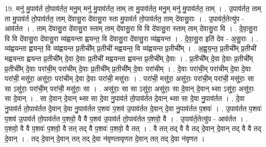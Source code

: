 \documentclass[17pt]{extarticle}
\begin{document}
19. मनु॑ मु॒पाव॑र्त तो॒पाव॑र्तत॒ मनु॒म् मनु॑ मु॒पाव॑र्तत॒ ताम् ता मु॒पाव॑र्तत॒ मनु॒म् मनु॑ मु॒पाव॑र्तत॒ ताम् । . उ॒पाव॑र्तत॒ ताम् ता मु॒पाव॑र्त तो॒पाव॑र्तत॒ ताम् दे॑वासु॒रा दे॑वासु॒रा स्ता मु॒पाव॑र्त तो॒पाव॑र्तत॒ ताम् दे॑वासु॒राः । . उ॒पाव॑र्त॒तेत्यु॑प - आव॑र्तत । . ताम् दे॑वासु॒रा दे॑वासु॒रा स्ताम् ताम् दे॑वासु॒रा वि वि दे॑वासु॒रा स्ताम् ताम् दे॑वासु॒रा वि । . दे॒वा॒सु॒रा वि वि दे॑वासु॒रा दे॑वासु॒रा व्य॑ह्वयन्ता ह्वयन्त॒ वि दे॑वासु॒रा दे॑वासु॒रा व्य॑ह्वयन्त । . दे॒वा॒सु॒रा इति॑ देव - अ॒सु॒राः । . व्य॑ह्वयन्ता ह्वयन्त॒ वि व्य॑ह्वयन्त प्र॒तीची᳚म् प्र॒तीची॑ मह्वयन्त॒ वि व्य॑ह्वयन्त प्र॒तीची᳚म् । . अ॒ह्व॒य॒न्त॒ प्र॒तीची᳚म् प्र॒तीची॑ मह्वयन्ता ह्वयन्त प्र॒तीची᳚म् दे॒वा दे॒वाः प्र॒तीची॑ मह्वयन्ता ह्वयन्त प्र॒तीची᳚म् दे॒वाः । . प्र॒तीची᳚म् दे॒वा दे॒वाः प्र॒तीची᳚म् प्र॒तीची᳚म् दे॒वाः परा॑ची॒म् परा॑चीम् दे॒वाः प्र॒तीची᳚म् प्र॒तीची᳚म् दे॒वाः परा॑चीम् । . दे॒वाः परा॑ची॒म् परा॑चीम् दे॒वा दे॒वाः परा॑ची॒ मसु॑रा॒ असु॑राः॒ परा॑चीम् दे॒वा दे॒वाः परा॑ची॒ मसु॑राः । . परा॑ची॒ मसु॑रा॒ असु॑राः॒ परा॑ची॒म् परा॑ची॒ मसु॑राः॒ सा सा ऽसु॑राः॒ परा॑ची॒म् परा॑ची॒ मसु॑राः॒ सा । . असु॑राः॒ सा सा ऽसु॑रा॒ असु॑राः॒ सा दे॒वान् दे॒वान् थ्सा ऽसु॑रा॒ असु॑राः॒ सा दे॒वान् । . सा दे॒वान् दे॒वान् थ्सा सा दे॒वा नु॒पाव॑र्त तो॒पाव॑र्तत दे॒वान् थ्सा सा दे॒वा नु॒पाव॑र्तत । . दे॒वा नु॒पाव॑र्त तो॒पाव॑र्तत दे॒वान् दे॒वा नु॒पाव॑र्तत प॒शवः॑ प॒शव॑ उ॒पाव॑र्तत दे॒वान् दे॒वा नु॒पाव॑र्तत प॒शवः॑ । . उ॒पाव॑र्तत प॒शवः॑ प॒शव॑ उ॒पाव॑र्त तो॒पाव॑र्तत प॒शवो॒ वै वै प॒शव॑ उ॒पाव॑र्त तो॒पाव॑र्तत प॒शवो॒ वै । . उ॒पाव॑र्त॒तेत्यु॑प - आव॑र्तत । . प॒शवो॒ वै वै प॒शवः॑ प॒शवो॒ वै तत् तद् वै प॒शवः॑ प॒शवो॒ वै तत् । . वै तत् तद् वै वै तद् दे॒वान् दे॒वान् तद् वै वै तद् दे॒वान् । . तद् दे॒वान् दे॒वान् तत् तद् दे॒वा न॑वृणतावृणत दे॒वान् तत् तद् दे॒वा न॑वृणत । \newline
\end{document}
